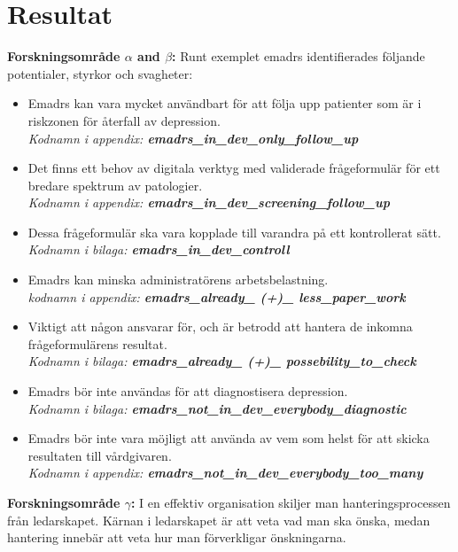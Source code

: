 \documentclass[12pt,a4paper,oneside]{article}
\let\oldcite\cite
\renewcommand*\cite[1]{\textsuperscript{\oldcite{#1}}}
\begin{document}
\section*{Resultat}
{\bf Forskningsomr{\aa}de $\alpha$ and $\beta$:} Runt exemplet e{\sc madrs} identifierades f{\"o}ljande potentialer, styrkor och svagheter:
\begin{itemize}
\item E{\sc madrs} kan vara mycket anv{\"a}ndbart f{\"o}r att f{\"o}lja upp patienter som {\"a}r i riskzonen f{\"o}r {\aa}terfall av depression. \\{\it Kodnamn i appendix: {\bfseries emadrs\_in\_dev\_only\_follow\_up}}
\item Det finns ett behov av digitala verktyg med validerade fr{\aa}geformul{\"a}r f{\"o}r ett bredare spektrum av patologier. \\{\it Kodnamn i appendix: {\bfseries emadrs\_in\_dev\_screening\_follow\_up}}
\item Dessa fr{\aa}geformul{\"a}r ska vara kopplade till varandra p{\aa} ett kontrollerat s{\"a}tt. \\{\it Kodnamn i bilaga: {\bfseries emadrs\_in\_dev\_controll}}
\item E{\sc madrs} kan minska administrat{\"o}rens arbetsbelastning.\\{\it kodnamn i appendix: {\bfseries emadrs\_already\_ (+)\_ less\_paper\_work}}
\item Viktigt att n{\aa}gon ansvarar f{\"o}r, och {\"a}r betrodd att hantera de inkomna fr{\aa}geformul{\"a}rens resultat. \\{\it Kodnamn i bilaga: {\bfseries emadrs\_already\_ (+)\_ possebility\_to\_check}}
\item E{\sc madrs} b{\"o}r inte anv{\"a}ndas f{\"o}r att diagnostisera depression. \\{\it Kodnamn i bilaga: {\bfseries emadrs\_not\_in\_dev\_everybody\_diagnostic}}
\item E{\sc madrs} b{\"o}r inte vara m{\"o}jligt att anv{\"a}nda av vem som helst f{\"o}r att skicka resultaten till v{\aa}rdgivaren. \\{\it Kodnamn i appendix: {\bfseries emadrs\_not\_in\_dev\_everybody\_too\_many}}
\end{itemize}
{\bf Forskningsomr{\aa}de $\gamma$:} I en effektiv organisation skiljer man hanteringsprocessen fr{\aa}n ledarskapet\cite {leader1}.
K{\"a}rnan i ledarskapet {\"a}r att veta vad man ska {\"o}nska, medan hantering inneb{\"a}r att veta hur man f{\"o}rverkligar {\"o}nskningarna.
\end{document}
